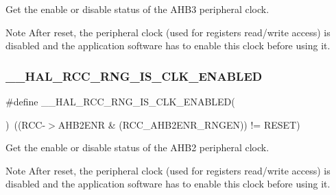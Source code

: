 Get the enable or disable status of the A\+H\+B3 peripheral clock. 

\begin{DoxyNote}{Note}
After reset, the peripheral clock (used for registers read/write access) is disabled and the application software has to enable this clock before using it. 
\end{DoxyNote}
\mbox{\label{group___r_c_c_ex___peripheral___clock___enable___disable___status_gabb083459b7bbd56c9b89db59bb75fdc2}} 
\subsubsection{\texorpdfstring{\_\_HAL\_RCC\_RNG\_IS\_CLK\_ENABLED}{\_\_HAL\_RCC\_RNG\_IS\_CLK\_ENABLED}}
{\footnotesize\ttfamily \#define \+\_\+\+\_\+\+H\+A\+L\+\_\+\+R\+C\+C\+\_\+\+R\+N\+G\+\_\+\+I\+S\+\_\+\+C\+L\+K\+\_\+\+E\+N\+A\+B\+L\+ED(\begin{DoxyParamCaption}{ }\end{DoxyParamCaption})~((R\+CC-\/$>$A\+H\+B2\+E\+NR \& (R\+C\+C\+\_\+\+A\+H\+B2\+E\+N\+R\+\_\+\+R\+N\+G\+EN)) != R\+E\+S\+ET)}



Get the enable or disable status of the A\+H\+B2 peripheral clock. 

\begin{DoxyNote}{Note}
After reset, the peripheral clock (used for registers read/write access) is disabled and the application software has to enable this clock before using it. 
\end{DoxyNote}
\mbox{\label{group___r_c_c_ex___peripheral___clock___enable___disable___status_gad2b7c3a381d791c4ee728e303935832a}} 
